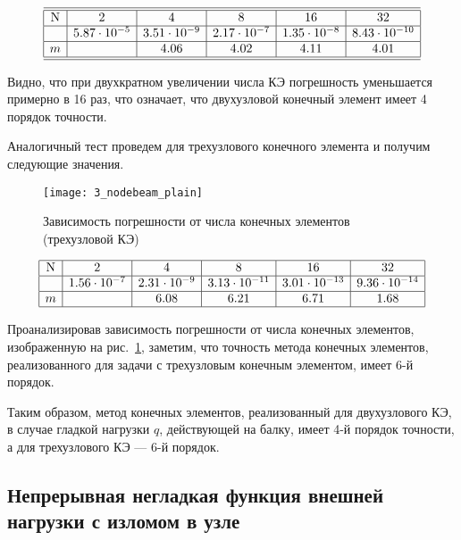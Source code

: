 \documentclass[12pt,a4paper]{article}
\begin{document}
\[
\begin{array}{|c|c|c|c|c|c|}
\hline
\hline
\text{N} & 2 & 4 & 8 & 16 & 32 \\ \hline
\Delta  & 5.87 \cdot 10^{-5}  & 3.51 \cdot 10^{-9} & 2.17 \cdot 10^{-7} & 1.35 \cdot 10^{-8} & 8.43 \cdot 10^{-10}\\ \hline
m &  & 4.06 & 4.02 & 4.11 & 4.01 \\ 
\hline
\hline
\end{array}
\]

Видно, что при двухкратном увеличении числа КЭ погрешность уменьшается примерно в 16 раз, что означает, что двухузловой конечный элемент имеет 4 порядок точности.

Аналогичный тест проведем для трехузлового конечного элемента и получим следующие значения. 

\begin{figure}[H]
		\centering
		\texttt{[image: 3\_nodebeam\_plain]}
		\caption{Зависимость погрешности от числа конечных элементов (трехузловой КЭ)}
		\label{fig:3_nodebeam_plain}
	\end{figure}
	
\[
\begin{array}{|c|c|c|c|c|c|}
\hline
\text{N} & 2 & 4 & 8 & 16 & 32 \\ \hline
\Delta  & 1.56 \cdot 10^{-7} & 2.31 \cdot 10^{-9} & 3.13 \cdot 10^{-11} & 3.01 \cdot 10^{-13} & 9.36 \cdot 10^{-14} \\ \hline
m &  & 6.08 & 6.21 & 6.71 & 1.68 \\ 
\hline
\end{array}
\]

Проанализировав зависимость погрешности от числа конечных элементов, изображенную на рис.~\ref{fig:3_nodebeam_plain}, заметим, что точность метода конечных элементов, реализованного для задачи с трехузловым конечным элементом, имеет 6-й порядок. 

Таким образом, метод конечных элементов, реализованный для двухузлового КЭ, в случае гладкой нагрузки $q$, действующей на балку, имеет 4-й порядок точности, а для трехузлового КЭ --- 6-й порядок. 



\subsection[Непрерывная негладкая функция внешней нагрузки]{Непрерывная негладкая функция внешней нагрузки с \glqq изломом \grqq в узле}
\end{document}
